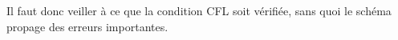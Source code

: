 \documentclass[
11pt, %
francais, %
singlespacing, %
headsepline, %
f%
]{MastersDoctoralThesis} %
\theoremstyle{definition}
\begin{document}
Il faut donc veiller à ce que la condition CFL soit vérifiée, sans quoi le schéma propage des erreurs importantes.

\end{document}
